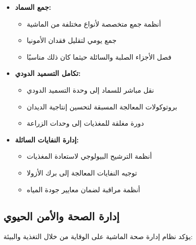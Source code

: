 \begin{itemize}
    \item \textbf{جمع السماد:}
    \begin{itemize}
        \item أنظمة جمع متخصصة لأنواع مختلفة من الماشية
        \item جمع يومي لتقليل فقدان الأمونيا
        \item فصل الأجزاء الصلبة والسائلة حيثما كان ذلك مناسبًا
    \end{itemize}
    
    \item \textbf{تكامل التسميد الدودي:}
    \begin{itemize}
        \item نقل مباشر للسماد إلى وحدة التسميد الدودي
        \item بروتوكولات المعالجة المسبقة لتحسين إنتاجية الديدان
        \item دورة مغلقة للمغذيات إلى وحدات الزراعة
    \end{itemize}
    
    \item \textbf{إدارة النفايات السائلة:}
    \begin{itemize}
        \item أنظمة الترشيح البيولوجي لاستعادة المغذيات
        \item توجيه النفايات المعالجة إلى برك الأزولا
        \item أنظمة مراقبة لضمان معايير جودة المياه
    \end{itemize}
\end{itemize}

\subsection{إدارة الصحة والأمن الحيوي}

يؤكد نظام إدارة صحة الماشية على الوقاية من خلال التغذية والبيئة:

